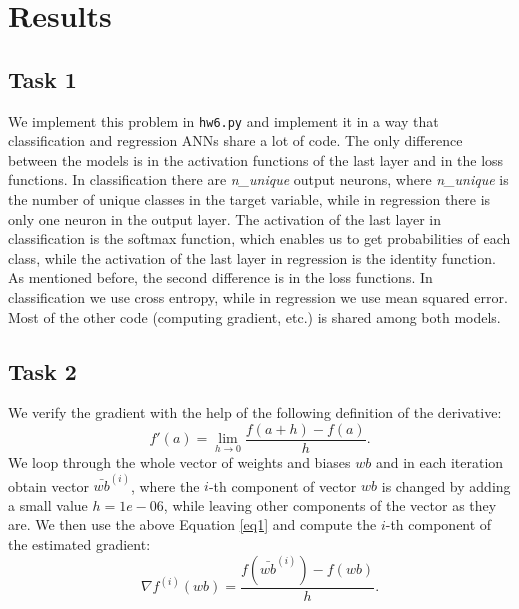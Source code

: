 \documentclass[fleqn,moreauthors,10pt]{ds_report}
\affiliation{\textit{}}
\begin{document}
\flushbottom 

\maketitle 

\thispagestyle{empty} 


\section*{Results}
\subsection*{Task 1}
We implement this problem in \texttt{hw6.py} and implement it in a way that classification and regression ANNs share a lot of code. The only difference between the models is in the activation functions of the last layer and in the loss functions. In classification there are \textit{n\_unique} output neurons, where \textit{n\_unique} is the number of unique classes in the target variable, while in regression there is only one neuron in the output layer. The activation of the last layer in classification is the softmax function, which enables us to get probabilities of each class, while the activation of the last layer in regression is the identity function. As mentioned before, the second difference is in the loss functions. In classification we use cross entropy, while in regression we use mean squared error. Most of the other code (computing gradient, etc.) is shared among both models.

\subsection*{Task 2}
We verify the gradient with the help of the following definition of the derivative:
\begin{equation}
\label{eq1}
f'(a) = \lim_{h \rightarrow 0} \frac{f(a+h) - f(a)}{h}.
\end{equation}
We loop through the whole vector of weights and biases $wb$ and in each iteration obtain vector $\bar{wb}^{(i)}$, where the $i$-th component of vector $wb$ is changed by adding a small value $h = 1e-06$, while leaving other components of the vector as they are. We then use the above Equation \ref{eq1} and compute the $i$-th component of the estimated gradient:
\begin{equation}
\nabla f^{(i)}(wb) = \frac{f(\bar{wb}^{(i)})-f(wb)}{h}.
\end{equation}
\end{document}
